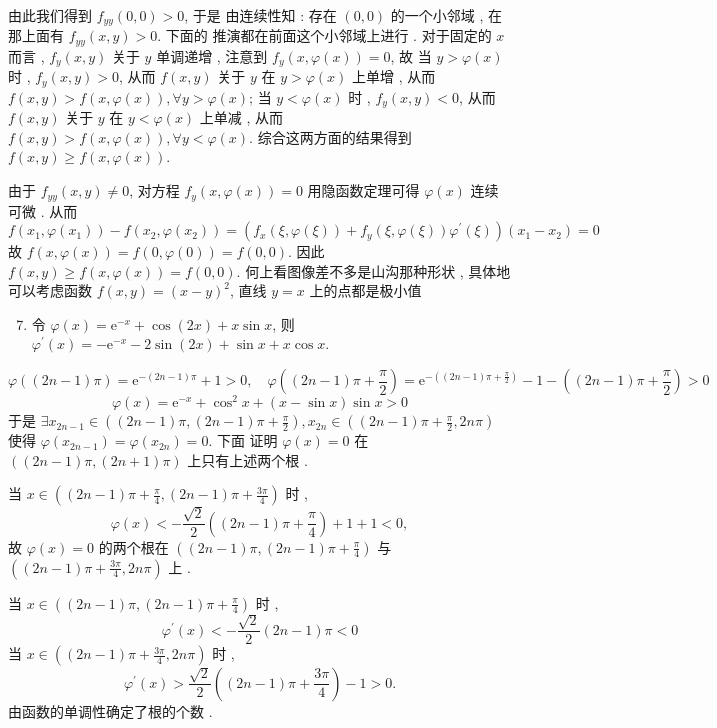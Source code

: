 \documentclass[10pt]{article}
\begin{document}
 由此我们得到  $f_{y y}(0,0)>0$,  于是   由连续性知 :  存在  $(0,0)$  的一个小邻域 ,  在那上面有  $f_{y y}(x, y)>0$.  下面的   推演都在前面这个小邻域上进行 .  对于固定的  $x$  而言 , $f_{y}(x, y)$  关于  $y$  单调递增 ,  注意到  $f_{y}(x, \varphi(x))=0$,  故   当  $y>\varphi(x)$  时 , $f_{y}(x, y)>0$,  从而  $f(x, y)$  关于  $y$  在  $y>\varphi(x)$  上单增 ,  从而  $f(x, y)>f(x, \varphi(x)), \forall y>\varphi(x)$;  当  $y<\varphi(x)$  时 , $f_{y}(x, y)<0$,  从而  $f(x, y)$  关于  $y$  在  $y<\varphi(x)$  上单减 ,  从而  $f(x, y)>f(x, \varphi(x)), \forall y<\varphi(x)$.  综合这两方面的结果得到  $f(x, y) \geqslant f(x, \varphi(x))$.

 由于  $f_{y y}(x, y) \neq 0$,  对方程  $f_{y}(x, \varphi(x))=0$  用隐函数定理可得  $\varphi(x)$  连续可微 .  从而 
$$
f\left(x_{1}, \varphi\left(x_{1}\right)\right)-f\left(x_{2}, \varphi\left(x_{2}\right)\right)=\left(f_{x}(\xi, \varphi(\xi))+f_{y}(\xi, \varphi(\xi)) \varphi^{\prime}(\xi)\right)\left(x_{1}-x_{2}\right)=0
$$
 故  $f(x, \varphi(x))=f(0, \varphi(0))=f(0,0)$.  因此  $f(x, y) \geqslant f(x, \varphi(x))=f(0,0)$.  何上看图像差不多是山沟那种形状 ,  具体地可以考虑函数  $f(x, y)=(x-y)^{2}$,  直线  $y=x$  上的点都是极小值 

\begin{enumerate}
  \setcounter{enumi}{6}
  \item  令  $\varphi(x)=\mathrm{e}^{-x}+\cos (2 x)+x \sin x$,  则  $\varphi^{\prime}(x)=-\mathrm{e}^{-x}-2 \sin (2 x)+\sin x+x \cos x$.
\end{enumerate}
$$
\varphi((2 n-1) \pi)=\mathrm{e}^{-(2 n-1) \pi}+1>0, \quad \varphi\left((2 n-1) \pi+\frac{\pi}{2}\right)=\mathrm{e}^{-\left((2 n-1) \pi+\frac{\pi}{2}\right)}-1-\left((2 n-1) \pi+\frac{\pi}{2}\right)>0
$$
$$
\varphi(x)=\mathrm{e}^{-x}+\cos ^{2} x+(x-\sin x) \sin x>0
$$
 于是  $\exists x_{2 n-1} \in\left((2 n-1) \pi,(2 n-1) \pi+\frac{\pi}{2}\right), x_{2 n} \in\left((2 n-1) \pi+\frac{\pi}{2}, 2 n \pi\right)$  使得  $\varphi\left(x_{2 n-1}\right)=\varphi\left(x_{2 n}\right)=0$.  下面   证明  $\varphi(x)=0$  在  $((2 n-1) \pi,(2 n+1) \pi)$  上只有上述两个根 .

 当  $x \in\left((2 n-1) \pi+\frac{\pi}{4},(2 n-1) \pi+\frac{3 \pi}{4}\right)$  时 ,
$$
\varphi(x)<-\frac{\sqrt{2}}{2}\left((2 n-1) \pi+\frac{\pi}{4}\right)+1+1<0,
$$
 故  $\varphi(x)=0$  的两个根在  $\left((2 n-1) \pi,(2 n-1) \pi+\frac{\pi}{4}\right)$  与  $\left((2 n-1) \pi+\frac{3 \pi}{4}, 2 n \pi\right)$  上 .

 当  $x \in\left((2 n-1) \pi,(2 n-1) \pi+\frac{\pi}{4}\right)$  时 ,
$$
\varphi^{\prime}(x)<-\frac{\sqrt{2}}{2}(2 n-1) \pi<0
$$
 当  $x \in\left((2 n-1) \pi+\frac{3 \pi}{4}, 2 n \pi\right)$  时 ,
$$
\varphi^{\prime}(x)>\frac{\sqrt{2}}{2}\left((2 n-1) \pi+\frac{3 \pi}{4}\right)-1>0 .
$$
 由函数的单调性确定了根的个数 .
\end{document}
